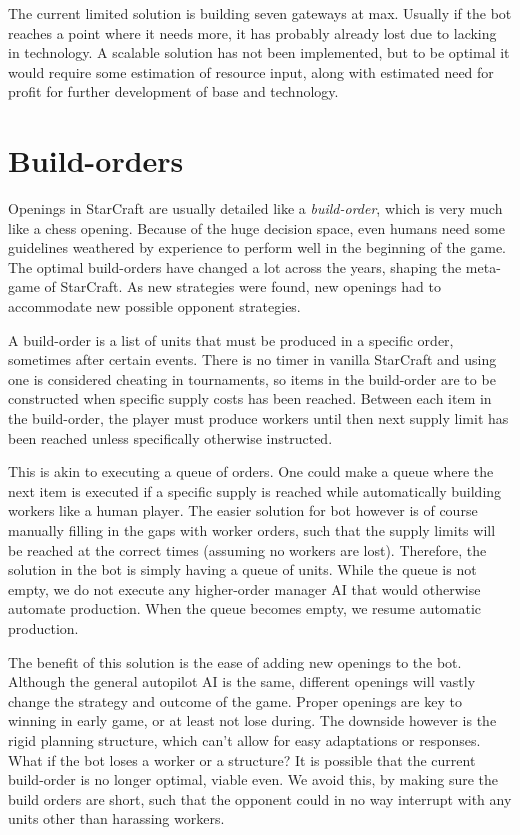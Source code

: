 	The current limited solution is building seven gateways at max. Usually if the bot reaches a point where it needs more, it has probably already lost due to lacking in technology. A scalable solution has not been implemented, but to be optimal it would require some estimation of resource input, along with estimated need for profit for further development of base and technology.

\section{Build-orders}
Openings in StarCraft are usually detailed like a \emph{build-order}, which is very much like a chess opening. Because of the huge decision space, even humans need some guidelines weathered by experience to perform well in the beginning of the game. The optimal build-orders have changed a lot across the years, shaping the meta-game of StarCraft. As new strategies were found, new openings had to accommodate new possible opponent strategies.

A build-order is a list of units that must be produced in a specific order, sometimes after certain events. There is no timer in vanilla StarCraft and using one is considered cheating in tournaments, so items in the build-order are to be constructed when specific supply costs has been reached. Between each item in the build-order, the player must produce workers until then next supply limit has been reached unless specifically otherwise instructed. 

This is akin to executing a queue of orders. One could make a queue where the next item is executed if a specific supply is reached while automatically building workers like a human player. The easier solution for bot however is of course manually filling in the gaps with worker orders, such that the supply limits will be reached at the correct times (assuming no workers are lost). Therefore, the solution in the bot is simply having a queue of units. While the queue is not empty, we do not execute any higher-order manager AI that would otherwise automate production. When the queue becomes empty, we resume automatic production.

The benefit of this solution is the ease of adding new openings to the bot. Although the general autopilot AI is the same, different openings will vastly change the strategy and outcome of the game. Proper openings are key to winning in early game, or at least not lose during. The downside however is the rigid planning structure, which can't allow for easy adaptations or responses. What if the bot loses a worker or a structure? It is possible that the current build-order is no longer optimal, viable even. We avoid this, by making sure the build orders are short, such that the opponent could in no way interrupt with any units other than harassing workers.

